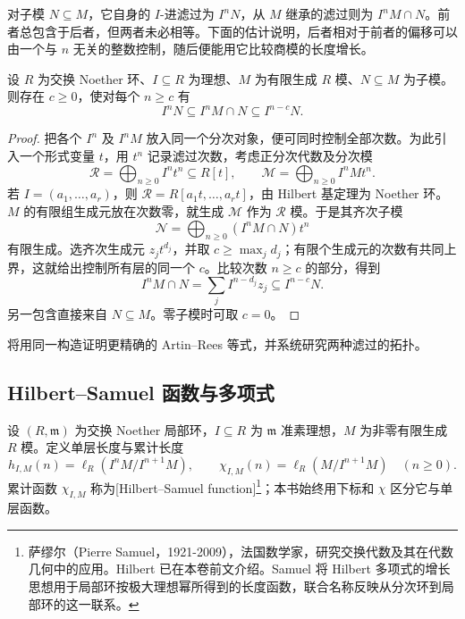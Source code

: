 对子模 \(N\subseteq M\)，它自身的 \(I\)-进滤过为 \(I^nN\)，从 \(M\) 继承的滤过则为 \(I^nM\cap N\)。前者总包含于后者，但两者未必相等。下面的估计说明，后者相对于前者的偏移可以由一个与 \(n\) 无关的整数控制，随后便能用它比较商模的长度增长。

\begin{lemma}[诱导滤过的控制]\label{b3:lem:induced-filtration-bound}
	设 \(R\) 为交换 Noether 环、\(I\subseteq R\) 为理想、\(M\) 为有限生成 \(R\) 模、\(N\subseteq M\) 为子模。则存在 \(c\ge0\)，使对每个 \(n\ge c\) 有
	\[
		I^nN\subseteq I^nM\cap N\subseteq I^{n-c}N.
	\]
\end{lemma}
\begin{proof}
	把各个 \(I^n\) 及 \(I^nM\) 放入同一个分次对象，便可同时控制全部次数。为此引入一个形式变量 \(t\)，用 \(t^n\) 记录滤过次数，考虑正分次代数及分次模
	\[
		\mathcal R=\bigoplus_{n\ge0}I^nt^n\subseteq R[t],\qquad \mathcal M=\bigoplus_{n\ge0}I^nMt^n.
	\]
	若 \(I=(a_1,\ldots,a_r)\)，则 \(\mathcal R=R[a_1t,\ldots,a_rt]\)，由 Hilbert 基定理为 Noether 环。\(M\) 的有限组生成元放在次数零，就生成 \(\mathcal M\) 作为 \(\mathcal R\) 模。于是其齐次子模
	\[
		\mathcal N=\bigoplus_{n\ge0}(I^nM\cap N)t^n
	\]
	有限生成。选齐次生成元 \(z_jt^{d_j}\)，并取 \(c\ge\max_jd_j\)；有限个生成元的次数有共同上界，这就给出控制所有层的同一个 \(c\)。比较次数 \(n\ge c\) 的部分，得到
	\[
		I^nM\cap N=\sum_j I^{n-d_j}z_j\subseteq I^{n-c}N.
	\]
	另一包含直接来自 \(N\subseteq M\)。零子模时可取 \(c=0\)。
\end{proof}

将用同一构造证明更精确的 Artin–Rees 等式，并系统研究两种滤过的拓扑。

\subsection{Hilbert–Samuel 函数与多项式}
\label{b3:subsec:1104:02}

\begin{definition}\label{b3:def:hilbert-samuel-function}
	设 \((R,\mathfrak m)\) 为交换 Noether 局部环，\(I\subseteq R\) 为 \(\mathfrak m\) 准素理想，\(M\) 为非零有限生成 \(R\) 模。定义单层长度与累计长度
	\[
		h_{I,M}(n)=\ell_R(I^nM/I^{n+1}M),\qquad \chi_{I,M}(n)=\ell_R(M/I^{n+1}M)\quad(n\ge0).
	\]
	累计函数 \(\chi_{I,M}\) 称为[Hilbert–Samuel function]\footnote{萨缪尔（Pierre Samuel，1921-2009），法国数学家，研究交换代数及其在代数几何中的应用。Hilbert 已在本卷前文介绍。Samuel 将 Hilbert 多项式的增长思想用于局部环按极大理想幂所得到的长度函数，联合名称反映从分次环到局部环的这一联系。}；本书始终用下标和 \(\chi\) 区分它与单层函数。
\end{definition}

